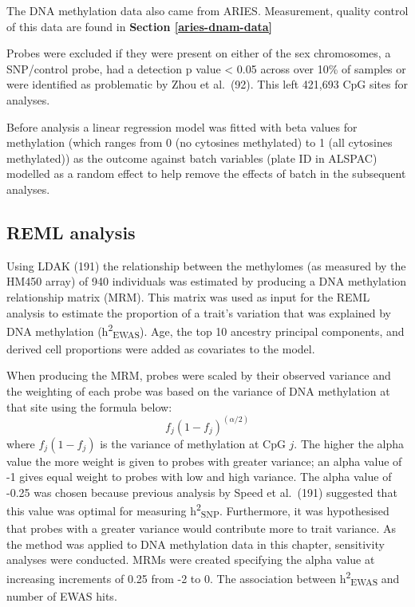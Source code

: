 \documentclass[11pt,twoside]{bristolthesis}
\begin{document}
The DNA methylation data also came from ARIES. Measurement, quality control of this data are found in \textbf{Section \ref{aries-dnam-data}}

Probes were excluded if they were present on either of the sex chromosomes, a SNP/control probe, had a detection p value \textless{} 0.05 across over 10\% of samples or were identified as problematic by Zhou et al.~(92). This left 421,693 CpG sites for analyses.

Before analysis a linear regression model was fitted with beta values for methylation (which ranges from 0 (no cytosines methylated) to 1 (all cytosines methylated)) as the outcome against batch variables (plate ID in ALSPAC) modelled as a random effect to help remove the effects of batch in the subsequent analyses.

\hypertarget{reml-analysis}{%
\subsection{REML analysis}\label{reml-analysis}}

Using LDAK (191) the relationship between the methylomes (as measured by the HM450 array) of 940 individuals was estimated by producing a DNA methylation relationship matrix (MRM). This matrix was used as input for the REML analysis to estimate the proportion of a trait's variation that was explained by DNA methylation (h\textsuperscript{2}\textsubscript{EWAS}). Age, the top 10 ancestry principal components, and derived cell proportions were added as covariates to the model.

When producing the MRM, probes were scaled by their observed variance and the weighting of each probe was based on the variance of DNA methylation at that site using the formula below:
\begin{equation}
    f_{j}(1-f_{j})^{(\alpha/2)}
    \label{eq:mrm-weights}
\end{equation}
where \(f_j(1-f_j)\) is the variance of methylation at CpG \(j\). The higher the alpha value the more weight is given to probes with greater variance; an alpha value of -1 gives equal weight to probes with low and high variance. The alpha value of -0.25 was chosen because previous analysis by Speed et al.~(191) suggested that this value was optimal for measuring h\textsuperscript{2}\textsubscript{SNP}. Furthermore, it was hypothesised that probes with a greater variance would contribute more to trait variance. As the method was applied to DNA methylation data in this chapter, sensitivity analyses were conducted. MRMs were created specifying the alpha value at increasing increments of 0.25 from -2 to 0. The association between h\textsuperscript{2}\textsubscript{EWAS} and number of EWAS hits.
\end{document}
